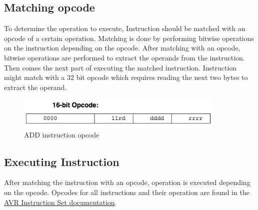 \subsection{Matching opcode}
To determine the operation to execute, Instruction should be matched with an opcode of a certain operation. Matching is done by performing bitwise operations on the instruction depending on the opcode. After matching with an opcode, bitwise operations are performed to extract the operands from the instruction. Then comes the next part of executing the matched instruction.
\noindent Instruction might match with a 32 bit opcode which requires reading the next two bytes to extract the operand.

\begin{figure}[h!]
\centering
\includegraphics[height=1.5cm, width=10cm]{opcode.png}
\caption{ADD instruction opcode \protect\cite{opcode:URL}}
\label{Instruction opcode example}
\end{figure}

\newpage

\subsection{Executing Instruction}
After matching the instruction with an opcode, operation is executed depending on the opcode. Opcodes for all instructions and their operation are found in the \href{http://www.atmel.com/images/doc0856.pdf}{AVR Instruction Set documentation}.
